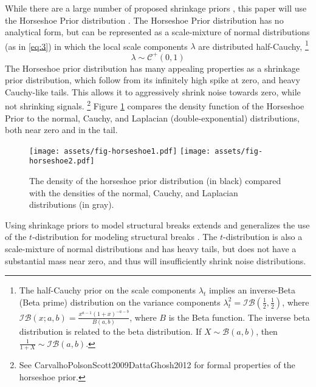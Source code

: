 \documentclass{article}
\newcommand{\dist}[1]{\mathcal{#1}}
\newcommand{\paren}[1]{\ensuremath{\left(#1\right)}}
\newcommand{\dhalfcauchy}[1]{\ensuremath{\dist{C}^{+}\paren{#1}}}
\newcommand{\dbeta}[1]{\ensuremath{\dist{B}\paren{#1}}}
\newcommand{\dinvbeta}[1]{\ensuremath{\dist{IB}\paren{#1}}}
\begin{document}
While there are a large number of proposed shrinkage priors \parencites{ArmaganDunsonLee2011}{BrownGriffin2010}{PolsonScott2010}, this paper will use the Horseshoe Prior distribution \parencites{CarvalhoPolsonScott2009}{CarvalhoPolsonScott2010}{PolsonScott2010}{PolsonScott2012}{DattaGhosh2012}.
The Horseshoe Prior distribution has no analytical form, but can be represented as a scale-mixture of normal distributions (as in \eqref{eq:3}) in which the local scale components $\lambda$ are distributed half-Cauchy,%
\footnote{
The half-Cauchy prior on the scale components $\lambda_{t}$ implies an inverse-Beta (Beta prime) distribution on the variance components $\lambda_{t}^{2} = \dinvbeta{\frac{1}{2}, \frac{1}{2}}$, where $\dinvbeta{x; a, b} = \frac{x^{a - 1} (1 + x)^{-a - b}}{B(a, b)}$, where $B$ is the Beta function.
The inverse beta distribution is related to the beta distribution.
If $X \sim \dbeta{a, b}$, then $\frac{1}{1 + X} \sim \dinvbeta{a, b}$.
}
\begin{equation}
  \label{eq:6}
  \lambda \sim \dhalfcauchy{0, 1}
\end{equation}
The Horseshoe prior distribution has many appealing properties as a shrinkage prior distribution, which follow from its infinitely high spike at zero, and heavy Cauchy-like tails.
This allows it to aggressively shrink noise towards zero, while not shrinking signals.%
\footnote{See \textcite{CarvalhoPolsonScott2010}{CarvalhoPolsonScott2009}{DattaGhosh2012} for formal properties of the horseshoe prior.}
Figure \ref{fig:horseshoe} compares the density function of the Horseshoe Prior to the normal, Cauchy, and Laplacian (double-exponential) distributions, both near zero and in the tail.
\begin{figure}
  \centering
  \texttt{[image: assets/fig-horseshoe1.pdf]}
  \texttt{[image: assets/fig-horseshoe2.pdf]}
  \caption{The density of the horseshoe prior distribution (in black) compared with the densities of the normal, Cauchy, and Laplacian distributions (in gray).}
  \label{fig:horseshoe}
\end{figure}

Using shrinkage priors to model structural breaks extends and generalizes the use of the $t$-distribution for modeling structural breaks \parencites{HarveyKoopman2000}[184][]{DurbinKoopman2001}{PetrisPetroneEtAl2009}.
The $t$-distribution is also a scale-mixture of normal distributions and has heavy tails, but does not have a substantial mass near zero, and thus will insufficiently shrink noise distributions.
\end{document}
